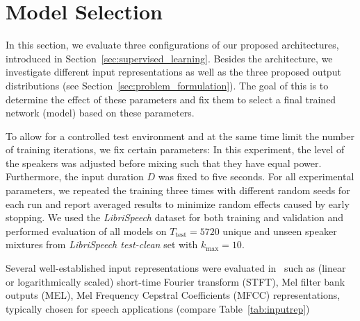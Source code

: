 \section{Model Selection}%
\label{sec:hyperparameters}
%
%

In this section, we evaluate three configurations of our proposed architectures, introduced in Section~\ref{sec:supervised_learning}.
Besides the architecture, we investigate different input representations as well as the three proposed output distributions (see Section~\ref{sec:problem_formulation}).
The goal of this is to determine the effect of these parameters and fix them to select a final trained network (model) based on these parameters.
\par
To allow for a controlled test environment and at the same time limit the number of training iterations, we fix certain parameters:
In this experiment, the level of the speakers was adjusted before mixing such that they have equal power.\@
Furthermore, the input duration \(D\) was fixed to five seconds.
For all experimental parameters, we repeated the training three times with different random seeds for each run and report averaged results to minimize random effects caused by early stopping.
We used the \emph{LibriSpeech} dataset for both training and validation and
performed evaluation of all models on \(T_{\textrm{test}} = 5720\) unique and unseen speaker mixtures from \emph{LibriSpeech test-clean} set with \(k_{\max} = 10\).
\par
Several well-established input representations were evaluated in~\cite{stoeter17} such as (linear or logarithmically scaled) short-time Fourier transform (STFT), Mel filter bank outputs (MEL), Mel Frequency Cepstral Coefficients (MFCC) representations, typically chosen for speech applications (compare Table~\ref{tab:inputrep})

